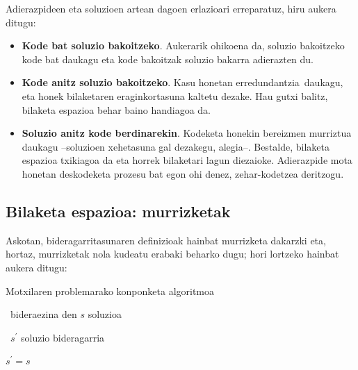 \documentclass[eu]{ifirak}\usepackage[]{graphicx}\usepackage[]{color}
\newcommand{\zkk}{\guillemotleft}
\newcommand{\skk}{\guillemotright}
\begin{document}
Adierazpideen eta soluzioen artean dagoen erlazioari erreparatuz, hiru aukera ditugu:

\begin{itemize}
\item \textbf{Kode bat soluzio bakoitzeko}. Aukerarik ohikoena da, soluzio bakoitzeko kode bat daukagu eta kode bakoitzak soluzio bakarra adierazten du.
\item \textbf{Kode anitz soluzio bakoitzeko}. Kasu honetan \zkk erredundantzia\skk\ daukagu, eta honek bilaketaren eraginkortasuna kaltetu dezake. Hau gutxi balitz, bilaketa espazioa behar baino handiagoa da.
\item \textbf{Soluzio anitz kode berdinarekin}. Kodeketa honekin bereizmen murriztua daukagu --soluzioen xehetasuna gal dezakegu, alegia--. Bestalde, bilaketa espazioa txikiagoa da eta horrek bilaketari lagun diezaioke. Adierazpide mota honetan deskodeketa prozesu bat egon ohi denez, zehar-kodetzea deritzogu.
\end{itemize}

\subsection{Bilaketa espazioa: murrizketak}

Askotan, bideragarritasunaren definizioak hainbat murrizketa dakarzki eta, hortaz, murrizketak nola kudeatu erabaki beharko dugu; hori lortzeko hainbat aukera ditugu:

\begin{ifalgorithm}[t]
\begin{ifpseudo}{Motxilaren problemarako konponketa algoritmoa}
\item \In\ bideraezina den $s$ soluzioa
\item \In\ $s^\prime$ soluzio bideragarria
\item $s^\prime = s$
\item {}
\item {}
\item {}
\item \Done
\end{ifpseudo}
\caption{Motxilaren problemarako bideragarriak ez diren soluzioak konpontzeko prozedura bat}\label{alg:motxila_problema_konpontzea}
\end{ifalgorithm}
\end{document}
